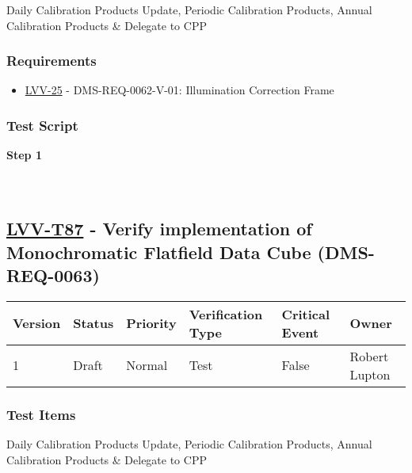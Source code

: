 Daily Calibration Products Update, Periodic Calibration Products, Annual
Calibration Products \& Delegate to CPP

\hypertarget{requirements-63}{%
\subsubsection{Requirements}\label{requirements-63}}

\begin{itemize}
\tightlist
\item
  \href{https://jira.lsstcorp.org/browse/LVV-25}{LVV-25} -
  DMS-REQ-0062-V-01: Illumination Correction Frame
\end{itemize}

\hypertarget{test-script-63}{%
\subsubsection{Test Script}\label{test-script-63}}

\textbf{Step 1}\\
~\\
~\\

\hypertarget{lvv-t87---verify-implementation-of-monochromatic-flatfield-data-cube-dms-req-0063}{%
\subsection{\texorpdfstring{\href{https://jira.lsstcorp.org/secure/Tests.jspa\#/testCase/LVV-T87}{LVV-T87}
- Verify implementation of Monochromatic Flatfield Data Cube
(DMS-REQ-0063)}{LVV-T87 - Verify implementation of Monochromatic Flatfield Data Cube (DMS-REQ-0063)}}\label{lvv-t87---verify-implementation-of-monochromatic-flatfield-data-cube-dms-req-0063}}

\begin{longtable}[]{@{}llllll@{}}
\toprule
Version & Status & Priority & Verification Type & Critical Event &
Owner\tabularnewline
\midrule
\endhead
1 & Draft & Normal & Test & False & Robert Lupton\tabularnewline
\bottomrule
\end{longtable}

\hypertarget{test-items-63}{%
\subsubsection{Test Items}\label{test-items-63}}

Daily Calibration Products Update, Periodic Calibration Products, Annual
Calibration Products \& Delegate to CPP

